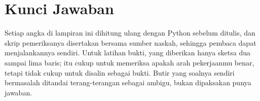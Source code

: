 \chapter{Kunci Jawaban}
\label{app:kunci}

Setiap angka di lampiran ini dihitung ulang dengan Python sebelum ditulis, dan skrip
pemeriksanya disertakan bersama sumber naskah, sehingga pembaca dapat menjalankannya
sendiri. Untuk latihan bukti, yang diberikan hanya sketsa dua sampai lima baris;
itu cukup untuk memeriksa apakah arah pekerjaanmu benar, tetapi tidak cukup untuk
disalin sebagai bukti. Butir yang soalnya sendiri bermasalah ditandai terang-terangan
sebagai ambigu, bukan dipaksakan punya jawaban.
